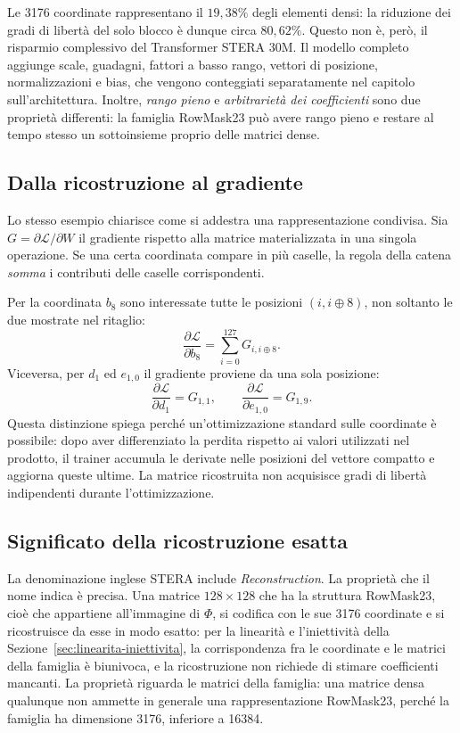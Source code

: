 Le \num{3176} coordinate rappresentano il $19{,}38\%$ degli elementi densi: la riduzione dei gradi di libertà del solo blocco è dunque circa $80{,}62\%$. Questo non è, però, il risparmio complessivo del Transformer STERA 30M. Il modello completo aggiunge scale, guadagni, fattori a basso rango, vettori di posizione, normalizzazioni e bias, che vengono conteggiati separatamente nel capitolo sull'architettura. Inoltre, \emph{rango pieno} e \emph{arbitrarietà dei coefficienti} sono due proprietà differenti: la famiglia RowMask23 può avere rango pieno e restare al tempo stesso un sottoinsieme proprio delle matrici dense.

\subsection{Dalla ricostruzione al gradiente}
\label{sec:esempio-gradiente-rowmask}

Lo stesso esempio chiarisce come si addestra una rappresentazione condivisa. Sia $G=\partial\mathcal{L}/\partial W$ il gradiente rispetto alla matrice materializzata in una singola operazione. Se una certa coordinata compare in più caselle, la regola della catena \emph{somma} i contributi delle caselle corrispondenti.

Per la coordinata $b_8$ sono interessate tutte le posizioni $(i,i\oplus8)$, non soltanto le due mostrate nel ritaglio:
\[
\frac{\partial\mathcal{L}}{\partial b_8}
=\sum_{i=0}^{127}G_{i,i\oplus8}.
\]
Viceversa, per $d_1$ ed $e_{1,0}$ il gradiente proviene da una sola posizione:
\[
\frac{\partial\mathcal{L}}{\partial d_1}=G_{1,1},
\qquad
\frac{\partial\mathcal{L}}{\partial e_{1,0}}=G_{1,9}.
\]
Questa distinzione spiega perché un'ottimizzazione standard sulle coordinate è possibile: dopo aver differenziato la perdita rispetto ai valori utilizzati nel prodotto, il trainer accumula le derivate nelle posizioni del vettore compatto e aggiorna queste ultime. La matrice ricostruita non acquisisce gradi di libertà indipendenti durante l'ottimizzazione.

\subsection{Significato della ricostruzione esatta}
\label{sec:esattezza-ricostruzione}

La denominazione inglese STERA include \emph{Reconstruction}. La proprietà che il nome indica è precisa. Una matrice $128\times128$ che ha la struttura RowMask23, cioè che appartiene all'immagine di $\Phi$, si codifica con le sue \num{3176} coordinate e si ricostruisce da esse in modo esatto: per la linearità e l'iniettività della Sezione~\ref{sec:linearita-iniettivita}, la corrispondenza fra le coordinate e le matrici della famiglia è biunivoca, e la ricostruzione non richiede di stimare coefficienti mancanti. La proprietà riguarda le matrici della famiglia: una matrice densa qualunque non ammette in generale una rappresentazione RowMask23, perché la famiglia ha dimensione \num{3176}, inferiore a \num{16384}.

